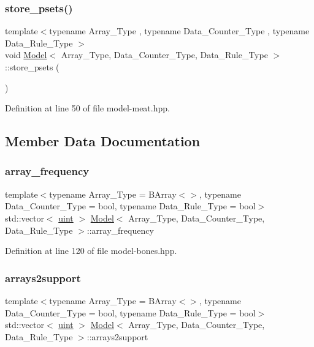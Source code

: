 \subsubsection{\texorpdfstring{store\+\_\+psets()}{store\_psets()}}
{\footnotesize\ttfamily template$<$typename Array\+\_\+\+Type , typename Data\+\_\+\+Counter\+\_\+\+Type , typename Data\+\_\+\+Rule\+\_\+\+Type $>$ \\
void \hyperlink{class_model}{Model}$<$ Array\+\_\+\+Type, Data\+\_\+\+Counter\+\_\+\+Type, Data\+\_\+\+Rule\+\_\+\+Type $>$\+::store\+\_\+psets (\begin{DoxyParamCaption}{ }\end{DoxyParamCaption})\hspace{0.3cm}{\ttfamily [inline]}}



Definition at line 50 of file model-\/meat.\+hpp.



\subsection{Member Data Documentation}
\mbox{\label{class_model_a8470b5bb905b692f24a3e5197f8680ed}} 
\subsubsection{\texorpdfstring{array\+\_\+frequency}{array\_frequency}}
{\footnotesize\ttfamily template$<$typename Array\+\_\+\+Type  = B\+Array$<$$>$, typename Data\+\_\+\+Counter\+\_\+\+Type  = bool, typename Data\+\_\+\+Rule\+\_\+\+Type  = bool$>$ \\
std\+::vector$<$ \hyperlink{typedefs_8hpp_a91ad9478d81a7aaf2593e8d9c3d06a14}{uint} $>$ \hyperlink{class_model}{Model}$<$ Array\+\_\+\+Type, Data\+\_\+\+Counter\+\_\+\+Type, Data\+\_\+\+Rule\+\_\+\+Type $>$\+::array\+\_\+frequency}



Definition at line 120 of file model-\/bones.\+hpp.

\mbox{\label{class_model_a038858e9cd8e396412c3867113a149e7}} 
\subsubsection{\texorpdfstring{arrays2support}{arrays2support}}
{\footnotesize\ttfamily template$<$typename Array\+\_\+\+Type  = B\+Array$<$$>$, typename Data\+\_\+\+Counter\+\_\+\+Type  = bool, typename Data\+\_\+\+Rule\+\_\+\+Type  = bool$>$ \\
std\+::vector$<$ \hyperlink{typedefs_8hpp_a91ad9478d81a7aaf2593e8d9c3d06a14}{uint} $>$ \hyperlink{class_model}{Model}$<$ Array\+\_\+\+Type, Data\+\_\+\+Counter\+\_\+\+Type, Data\+\_\+\+Rule\+\_\+\+Type $>$\+::arrays2support}



